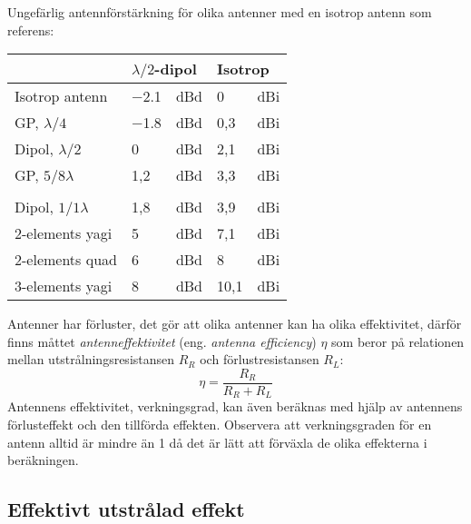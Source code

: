\noindent
Ungefärlig antennförstärkning för olika antenner med en isotrop antenn som
referens:
\vspace{1ex}
\begin{center}
\begin{tabular}{l|ll|ll}
  & \multicolumn{2}{l|}{\(\lambda/2\)-dipol} &
  \multicolumn{2}{l}{Isotrop} \\
  \hline
  Isotrop antenn       & \num{-2,1} & dBd & 0   & dBi \\
  GP, \(\lambda/4\)    & \num{-1,8} & dBd & 0,3 & dBi \\
  Dipol, \(\lambda/2\) & 0    & dBd & 2,1 & dBi \\
  GP, \(5/8\lambda\)   & 1,2  & dBd & 3,3 & dBi \\
  & & & & \\
  Dipol, \(1/1\lambda\) & 1,8 & dBd & 3,9  & dBi \\
  2-elements yagi       & 5   & dBd & 7,1  & dBi \\
  2-elements quad       & 6   & dBd & 8    & dBi \\
  3-elements yagi       & 8   & dBd & 10,1 & dBi \\
\end{tabular}
\end{center}

\vspace{1ex}
\noindent
Antenner har förluster, det gör att olika antenner kan ha olika
effektivitet, därför finns måttet \emph{antenneffektivitet}
(eng. \emph{antenna efficiency}) \(\eta\) som beror på relationen mellan
utstrålningsresistansen \(R_R\) och förlustresistansen \(R_L\):
\[\eta = \frac{R_R}{R_R+R_L}\]
Antennens effektivitet, verkningsgrad, kan även beräknas med hjälp av antennens
förlusteffekt och den tillförda effekten.
Observera att verkningsgraden för en antenn alltid är mindre än 1 då det är lätt
att förväxla de olika effekterna i beräkningen.

\subsection{Effektivt utstrålad effekt}


